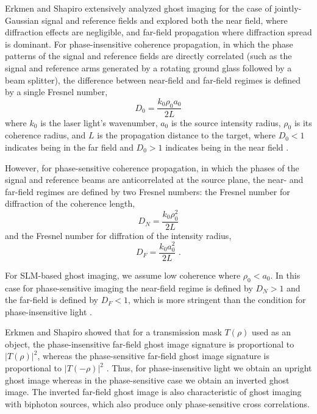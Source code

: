 Erkmen and Shapiro extensively analyzed ghost imaging for the case of jointly-Gaussian signal and reference fields and explored both the near field, where diffraction effects are negligible, and far-field propagation where diffraction spread is dominant. For phase-insensitive coherence propagation, in which the phase patterns of the signal and reference fields are directly correlated (such as the signal and reference arms generated by a rotating ground glass followed by a beam splitter), the difference between near-field and far-field regimes is defined by a single Fresnel number,
\begin{equation}
D_0 = \frac{k_0 \rho_0 a_0}{2L}
\end{equation}
where $k_0$ is the laser light's wavenumber, $a_0$ is the source intensity radius, $\rho_0$ is its coherence radius, and $L$ is the propagation distance to the target, where $D_0 < 1$ indicates being in the far field and $D_0 > 1$ indicates being in the near field \cite{erkmen-unified}.

However, for phase-sensitive coherence propagation, in which the phases of the signal and reference beams are anticorrelated at the source plane, the near- and far-field regimes are defined by two Fresnel numbers: the Fresnel number for diffraction of the coherence length,
\begin{equation}
D_N = \frac{k_0\rho_0^2}{2L}
\end{equation}
and the Fresnel number for diffration of the intensity radius,
\begin{equation}
D_F = \frac{k_0 a_0^2}{2L}\,\,.
\end{equation}

For SLM-based ghost imaging, we assume low coherence where $\rho_0 < a_0$. In this case for phase-sensitive imaging the near-field regime is defined by $D_N > 1$ and the far-field is defined by $D_F < 1$, which is more stringent than the condition for phase-insensitive light \cite{erkmen-unified}.

Erkmen and Shapiro showed that for a transmission mask $T(\rho)$ used as an object, the phase-insensitive far-field ghost image signature is proportional to $|T(\rho)|^2$, whereas the phase-sensitive far-field ghost image signature is proportional to $|T(-\rho)|^2$ \cite{erkmen-unified}. Thus, for phase-insensitive light we obtain an upright ghost image whereas in the phase-sensitive case we obtain an inverted ghost image. The inverted far-field ghost image is also characteristic of ghost imaging with biphoton sources, which also produce only phase-sensitive cross correlations.


